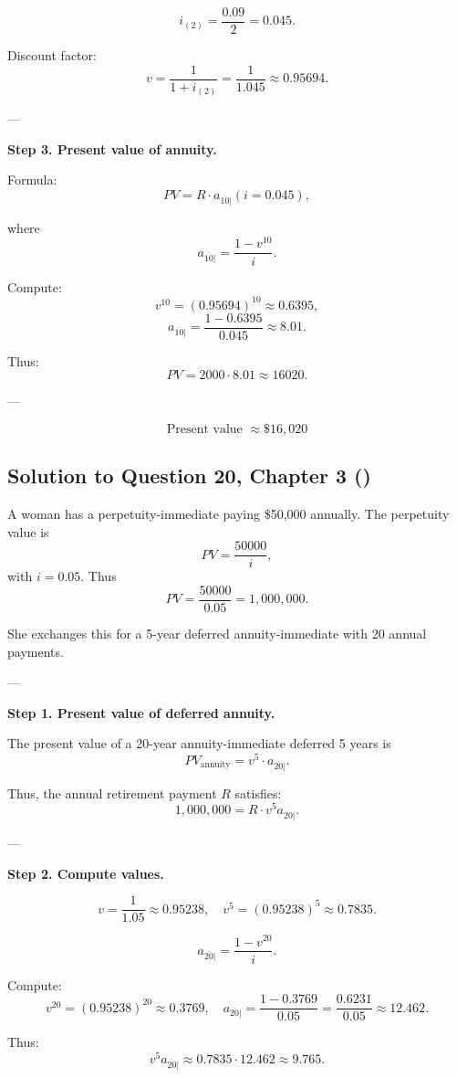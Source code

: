\documentclass[12pt, a4paper]{article}
\begin{document}
{\[
i_{(2)} = \frac{0.09}{2} = 0.045.
\]

Discount factor:
\[
v = \frac{1}{1+i_{(2)}} = \frac{1}{1.045} \approx 0.95694.
\]

---

\textbf{Step 3. Present value of annuity.}

Formula:
\[
PV = R \cdot a_{\overline{10}|}(i=0.045),
\]

where
\[
a_{\overline{10}|} = \frac{1-v^{10}}{i}.
\]

Compute:
\[
v^{10} = (0.95694)^{10} \approx 0.6395,
\]
\[
a_{\overline{10}|} = \frac{1-0.6395}{0.045} \approx 8.01.
\]

Thus:
\[
PV = 2000 \cdot 8.01 \approx 16020.
\]

---

\[
\boxed{\text{Present value } \approx \$16{,}020}
\]

\subsection*{Solution to Question 20, Chapter 3 (\cite{toi3rd})}

A woman has a perpetuity-immediate paying \$50{,}000 annually.  
The perpetuity value is
\[
PV = \frac{50000}{i},
\]
with $i=0.05$.  
Thus
\[
PV = \frac{50000}{0.05} = 1{,}000{,}000.
\]

She exchanges this for a 5-year deferred annuity-immediate with 20 annual payments.  

---

\textbf{Step 1. Present value of deferred annuity.}

The present value of a 20-year annuity-immediate deferred 5 years is
\[
PV_{\text{annuity}} = v^5 \cdot a_{\overline{20}|}.
\]

Thus, the annual retirement payment $R$ satisfies:
\[
1{,}000{,}000 = R \cdot v^5 a_{\overline{20}|}.
\]

---

\textbf{Step 2. Compute values.}

\[
v = \frac{1}{1.05} \approx 0.95238,
\quad v^5 = (0.95238)^5 \approx 0.7835.
\]

\[
a_{\overline{20}|} = \frac{1-v^{20}}{i}.
\]

Compute:
\[
v^{20} = (0.95238)^{20} \approx 0.3769,
\quad a_{\overline{20}|} = \frac{1-0.3769}{0.05} = \frac{0.6231}{0.05} \approx 12.462.
\]

Thus:
\[
v^5 a_{\overline{20}|} \approx 0.7835 \cdot 12.462 \approx 9.765.
\]

}
\end{document}

